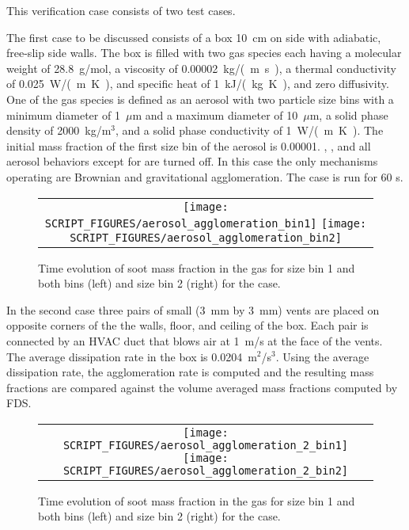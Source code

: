 \documentclass[11pt]{book}
\begin{document}
This verification case consists of two test cases.

The first case to be discussed consists of a box 10~cm on side with adiabatic, free-slip side walls. The box is filled with two gas species each having a molecular weight of 28.8~g/mol, a viscosity of 0.00002~\si{kg/(m.s)}, a thermal conductivity of 0.025~\si{W/(m.K)}, and specific heat of 1~\si{kJ/(kg.K)}, and zero diffusivity. One of the gas species is defined as an aerosol with two particle size bins with a minimum diameter of 1~$\mu$m and a maximum diameter of 10~$\mu$m, a solid phase density of 2000~kg/m$^3$, and a solid phase conductivity of 1~\si{W/(m.K)}. The initial mass fraction of the first size bin of the aerosol is 0.00001. , , and all aerosol behaviors except for  are turned off. In this case the only mechanisms operating are Brownian and gravitational agglomeration. The case is run for 60 s.

\begin{figure}[ht]
    \centering
    \begin{tabular}{c}
        \texttt{[image: SCRIPT\_FIGURES/aerosol\_agglomeration\_bin1]}
        \texttt{[image: SCRIPT\_FIGURES/aerosol\_agglomeration\_bin2]}
    \end{tabular}
    \caption[Gas phase soot mass fractions the  cases]{Time evolution of soot mass fraction in the gas for size bin 1 and both bins (left) and size bin 2 (right) for the  case.}
    \label{fig:agglomeration}
\end{figure}

In the second case three pairs of small (3~mm by 3~mm) vents are placed on opposite corners of the the walls, floor, and ceiling of the box. Each pair is connected by an HVAC duct that blows air at 1~m/s at the face of the vents. The average dissipation rate in the box is 0.0204~m$^2$/s$^3$. Using the average dissipation rate, the agglomeration rate is computed and the resulting mass fractions are compared against the volume averaged mass fractions computed by FDS.

\begin{figure}[ht]
    \centering
    \begin{tabular}{c}
        \texttt{[image: SCRIPT\_FIGURES/aerosol\_agglomeration\_2\_bin1]}
        \texttt{[image: SCRIPT\_FIGURES/aerosol\_agglomeration\_2\_bin2]}
    \end{tabular}
    \caption[Gas phase soot mass fractions the  cases]{Time evolution of soot mass fraction in the gas for size bin 1 and both bins (left) and size bin 2 (right) for the  case.}
    \label{fig:agglomeration_2}
\end{figure}
\end{document}
